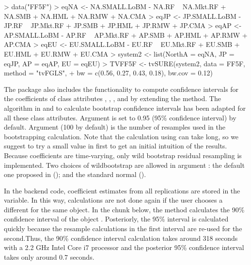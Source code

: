 \begin{Schunk}
\begin{Sinput}
> data("FF5F")
> eqNA <- NA.SMALL.LoBM - NA.RF ~ NA.Mkt.RF + NA.SMB + NA.HML + NA.RMW + NA.CMA
> eqJP <- JP.SMALL.LoBM - JP.RF ~ JP.Mkt.RF + JP.SMB + JP.HML + JP.RMW + JP.CMA
> eqAP <- AP.SMALL.LoBM - AP.RF ~ AP.Mkt.RF + AP.SMB + AP.HML + AP.RMW + AP.CMA
> eqEU <- EU.SMALL.LoBM - EU.RF ~ EU.Mkt.RF + EU.SMB + EU.HML + EU.RMW + EU.CMA
> system2 <- list(NorthA = eqNA, JP = eqJP, AP = eqAP, EU = eqEU)
> TVFF5F <- tvSURE(system2, data = FF5F, method = "tvFGLS", 
+                  bw = c(0.56, 0.27, 0.43, 0.18), bw.cov = 0.12)
\end{Sinput}
\end{Schunk}

The package  also includes the functionality to compute confidence intervals for the coefficients of class attributes , , ,  and  by extending the  method. The algorithm in \citet{FanWenyang2000} and \citet{Chenetal2017} to calculate bootstrap confidence intervals has been adapted for all these class attributes. Argument  is set to 0.95 (95\% confidence interval) by default. Argument  (100 by default) is the number of resamples used in the  bootstrapping calculation. Note that the calculation using  can take long, so we suggest to try a small value in  first to get an initial intuition of the results. Because coefficients are time-varying, only wild bootstrap residual resampling is implemented. Two choices of wildbootstrap are allowed in argument : the default one proposed in \citet{Mammen1993} (); and the standard normal (). 

In the backend code, coefficient estimates from all replications are stored in the  variable. In this way, calculations are not done again if the user chooses a different  for the same object. In the chunk below, the  method calculates the 90\% confidence interval of the object . Posteriorly, the 95\% interval is calculated quickly because the resample calculations in the first interval are re-used for the second.Thus, the 90\% confidence interval calculation takes around 318 seconds with a 2.2 GHz Intel Core i7 processor and the posterior 95\% confidence interval takes only around 0.7 seconds. 

